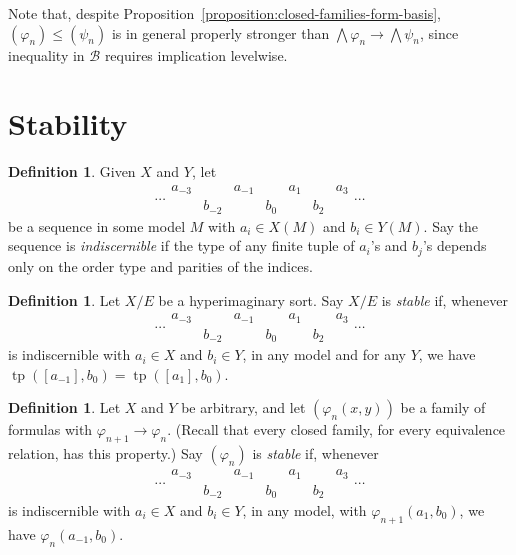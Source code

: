\documentclass{article}
\theoremstyle{definition}
\newtheorem{definition}[theorem]{Definition}
\newcommand{\defterm}{\emph}
\newcommand{\B}{\mathcal{B}}
\DeclareMathOperator{\tp}{tp}
\begin{document}
Note that, despite Proposition~\ref{proposition:closed-families-form-basis}, $(\varphi_n) \leq (\psi_n)$ is in general properly stronger than $\bigwedge \varphi_n \rightarrow \bigwedge \psi_n$, since inequality in $\B$ requires implication levelwise.

\section{Stability}

\begin{definition}
  Given $X$ and $Y$, let
  \begin{equation*}
    \cdots
    \begin{matrix}
      a_{-3} & & a_{-1} & & a_1 & & a_3 \\
      & b_{-2} & & b_0 & & b_2 &
    \end{matrix}
    \cdots
  \end{equation*}
  be a sequence in some model $M$ with $a_i \in X(M)$ and $b_i \in Y(M)$. Say the sequence is \defterm{indiscernible} if the type of any finite tuple of $a_i$'s and $b_j$'s depends only on the order type and parities of the indices.
\end{definition}

\begin{definition}
  Let $X/E$ be a hyperimaginary sort. Say $X/E$ is \defterm{stable} if, whenever
  \begin{equation*}
    \cdots
    \begin{matrix}
      a_{-3} & & a_{-1} & & a_1 & & a_3 \\
      & b_{-2} & & b_0 & & b_2 &
    \end{matrix}
    \cdots
  \end{equation*}
  is indiscernible with $a_i \in X$ and $b_i \in Y$, in any model and for any $Y$, we have $\tp([a_{-1}],b_0) = \tp([a_1],b_0)$.
\end{definition}

\begin{definition}
  Let $X$ and $Y$ be arbitrary, and let $(\varphi_n(x,y))$ be a family of formulas with $\varphi_{n+1} \rightarrow \varphi_n$. (Recall that every closed family, for every equivalence relation, has this property.) Say $(\varphi_n)$ is \defterm{stable} if, whenever
  \begin{equation*}
    \cdots
    \begin{matrix}
      a_{-3} & & a_{-1} & & a_1 & & a_3 \\
      & b_{-2} & & b_0 & & b_2 &
    \end{matrix}
    \cdots
  \end{equation*}
  is indiscernible with $a_i \in X$ and $b_i \in Y$, in any model, with $\varphi_{n+1}(a_1,b_0)$, we have $\varphi_n(a_{-1},b_0)$.
\end{definition}
\end{document}
